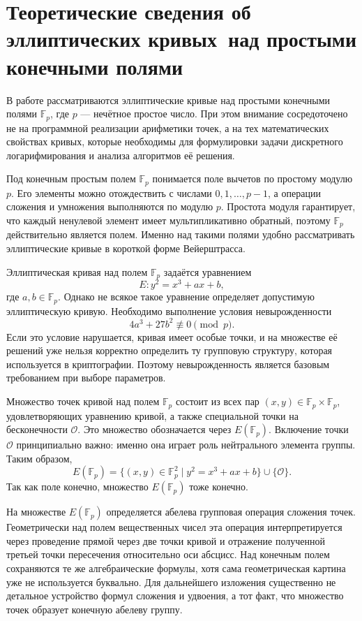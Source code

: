 \section[Теоретические сведения об эллиптических кривых]{Теоретические сведения об эллиптических кривых\ над простыми конечными полями}

В работе рассматриваются эллиптические кривые над простыми конечными полями $\mathbb{F}_p$, где $p$ --- нечётное простое число. При этом внимание сосредоточено не на программной реализации арифметики точек, а на тех математических свойствах кривых, которые необходимы для формулировки задачи дискретного логарифмирования и анализа алгоритмов её решения.

Под конечным простым полем $\mathbb{F}_p$ понимается поле вычетов по простому модулю $p$. Его элементы можно отождествить с числами $0,1,\dots,p-1$, а операции сложения и умножения выполняются по модулю $p$. Простота модуля гарантирует, что каждый ненулевой элемент имеет мультипликативно обратный, поэтому $\mathbb{F}_p$ действительно является полем. Именно над такими полями удобно рассматривать эллиптические кривые в короткой форме Вейерштрасса.

Эллиптическая кривая над полем $\mathbb{F}_p$ задаётся уравнением
\[
E: y^2 = x^3 + ax + b,
\]
где $a,b \in \mathbb{F}_p$. Однако не всякое такое уравнение определяет допустимую эллиптическую кривую. Необходимо выполнение условия невырожденности
\[
4a^3 + 27b^2 \not\equiv 0 \pmod p.
\]
Если это условие нарушается, кривая имеет особые точки, и на множестве её решений уже нельзя корректно определить ту групповую структуру, которая используется в криптографии. Поэтому невырожденность является базовым требованием при выборе параметров.

Множество точек кривой над полем $\mathbb{F}_p$ состоит из всех пар $(x,y) \in \mathbb{F}_p \times \mathbb{F}_p$, удовлетворяющих уравнению кривой, а также специальной точки на бесконечности $\mathcal{O}$. Это множество обозначается через $E(\mathbb{F}_p)$. Включение точки $\mathcal{O}$ принципиально важно: именно она играет роль нейтрального элемента группы. Таким образом,
\[
E(\mathbb{F}_p)=\{(x,y)\in \mathbb{F}_p^2 \mid y^2=x^3+ax+b\}\cup\{\mathcal{O}\}.
\]
Так как поле конечно, множество $E(\mathbb{F}_p)$ тоже конечно.

На множестве $E(\mathbb{F}_p)$ определяется абелева групповая операция сложения точек. Геометрически над полем вещественных чисел эта операция интерпретируется через проведение прямой через две точки кривой и отражение полученной третьей точки пересечения относительно оси абсцисс. Над конечным полем сохраняются те же алгебраические формулы, хотя сама геометрическая картина уже не используется буквально. Для дальнейшего изложения существенно не детальное устройство формул сложения и удвоения, а тот факт, что множество точек образует конечную абелеву группу.

